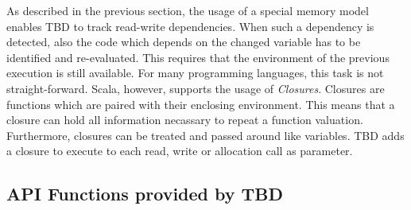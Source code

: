 As described in the previous section, the usage of a special memory model enables TBD to track read-write dependencies. When such a dependency is detected, also the code which depends on the changed variable has to be identified and re-evaluated. This requires that the environment of the previous execution is still available. For many programming languages, this task is not straight-forward. Scala, however, supports the usage of \textit{Closures}. Closures are functions which are paired with their enclosing environment. This means that a closure can hold all information necassary to repeat a function valuation. Furthermore, closures can be treated and passed around like variables. TBD adds a closure to execute to each read, write or allocation call as parameter.


\subsection{API Functions provided by TBD} 


